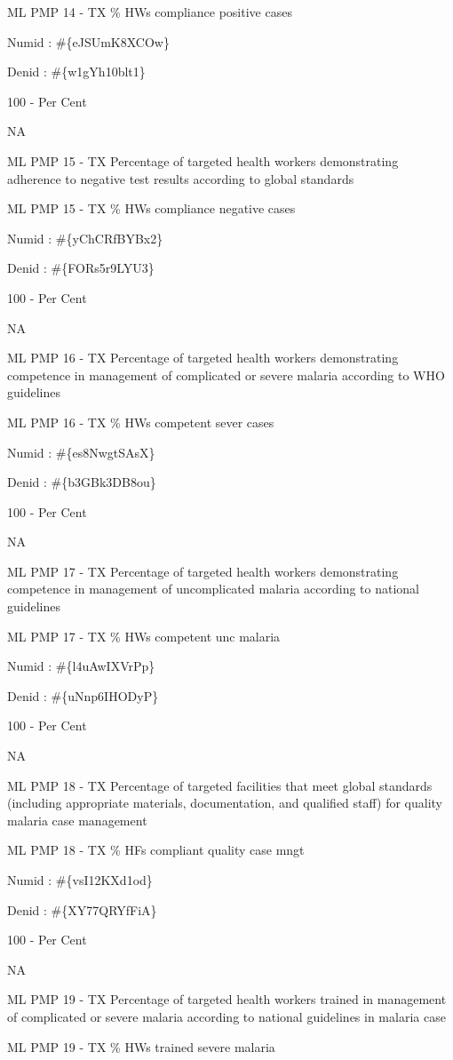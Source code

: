 \documentclass[]{book}
\begin{document}
ML PMP 14 - TX \% HWs compliance positive cases

Numid : \#\{eJSUmK8XCOw\}

Denid : \#\{w1gYh10blt1\}

100 - Per Cent

NA

ML PMP 15 - TX Percentage of targeted health workers demonstrating adherence to negative test results according to global standards

ML PMP 15 - TX \% HWs compliance negative cases

Numid : \#\{yChCRfBYBx2\}

Denid : \#\{FORs5r9LYU3\}

100 - Per Cent

NA

ML PMP 16 - TX Percentage of targeted health workers demonstrating competence in management of complicated or severe malaria according to WHO guidelines

ML PMP 16 - TX \% HWs competent sever cases

Numid : \#\{es8NwgtSAsX\}

Denid : \#\{b3GBk3DB8ou\}

100 - Per Cent

NA

ML PMP 17 - TX Percentage of targeted health workers demonstrating competence in management of uncomplicated malaria according to national guidelines

ML PMP 17 - TX \% HWs competent unc malaria

Numid : \#\{l4uAwIXVrPp\}

Denid : \#\{uNnp6IHODyP\}

100 - Per Cent

NA

ML PMP 18 - TX Percentage of targeted facilities that meet global standards (including appropriate materials, documentation, and qualified staff) for quality malaria case management

ML PMP 18 - TX \% HFs compliant quality case mngt

Numid : \#\{vsI12KXd1od\}

Denid : \#\{XY77QRYfFiA\}

100 - Per Cent

NA

ML PMP 19 - TX Percentage of targeted health workers trained in management of complicated or severe malaria according to national guidelines in malaria case

ML PMP 19 - TX \% HWs trained severe malaria
\end{document}
